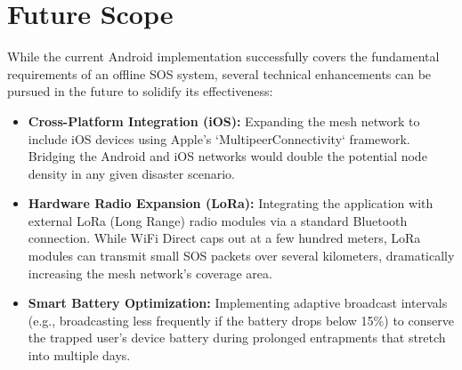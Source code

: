 \section{Future Scope}
While the current Android implementation successfully covers the fundamental requirements of an offline SOS system, several technical enhancements can be pursued in the future to solidify its effectiveness:
\begin{itemize}
    \item \textbf{Cross-Platform Integration (iOS):} Expanding the mesh network to include iOS devices using Apple's `MultipeerConnectivity` framework. Bridging the Android and iOS networks would double the potential node density in any given disaster scenario.
    \item \textbf{Hardware Radio Expansion (LoRa):} Integrating the application with external LoRa (Long Range) radio modules via a standard Bluetooth connection. While WiFi Direct caps out at a few hundred meters, LoRa modules can transmit small SOS packets over several kilometers, dramatically increasing the mesh network's coverage area.
    \item \textbf{Smart Battery Optimization:} Implementing adaptive broadcast intervals (e.g., broadcasting less frequently if the battery drops below 15\%) to conserve the trapped user's device battery during prolonged entrapments that stretch into multiple days.
\end{itemize}